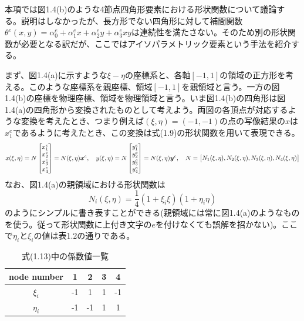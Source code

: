 \documentclass[dvipdfmx, 9pt, a4paper]{jsarticle}
\numberwithin{equation}{section}
\newcommand{\bm}[1]{{\mbox{\boldmath $#1$}}}
\begin{document}
本項では図1.4(b)のような4節点四角形要素における形状関数について議論する。説明はしなかったが、長方形でない四角形に対して補間関数$\theta^e(x, y)=\alpha^e_0 + \alpha^e_1x+\alpha^e_2y+\alpha^e_3xy$は連続性を満たさない。そのため別の形状関数が必要となる訳だが、ここではアイソパラメトリック要素という手法を紹介する。\par
まず、図1.4(a)に示すような$\xi-\eta$の座標系と、各軸$[-1,1]$の領域の正方形を考える。このような座標系を親座標、領域$[-1,1]$を親領域と言う。一方の図1.4(b)の座標を物理座標、領域を物理領域と言う。いま図1.4(b)の四角形は図1.4(a)の四角形から変換されたものとして考えよう。両図の各頂点が対応するような変換を考えたとき、つまり例えば$(\xi, \eta)=(-1, -1)$の点の写像結果の$x$は$x^e_1$であるように考えたとき、この変換は式(1.9)の形状関数を用いて表現できる。
\begin{equation}
x(\xi, \eta) = N
\begin{bmatrix}
x^e_1 \\ x^e_2 \\ x^e_3 \\ x^e_4
\end{bmatrix}=N(\xi, \eta)\bm x^e,~~~
y(\xi, \eta) = N
\begin{bmatrix}
y^e_1 \\ y^e_2 \\ y^e_3 \\ y^e_4
\end{bmatrix}=N(\xi, \eta)\bm y^e,~~~
N=\begin{bmatrix}
N_1(\xi, \eta), N_2(\xi, \eta), N_3(\xi, \eta), N_4(\xi, \eta)
\end{bmatrix}
\end{equation}
なお、図1.4(a)の親領域における形状関数は
\begin{equation}
N_i(\xi, \eta)=\frac{1}{4}(1+\xi_i\xi)(1+\eta_i\eta)
\end{equation}
のようにシンプルに書き表すことができる(親領域には常に図1.4(a)のようなものを使う。従って形状関数に上付き文字の$e$を付けなくても誤解を招かない)。ここで$\eta_i$と$\xi_i$の値は表1.2の通りである。\par
\begin{table}[b]
\begin{center}
\caption{式(1.13)中の係数値一覧}
\begin{tabular}{c|cccc}
\hline
node number & 1 & 2 & 3 & 4 \\ \hline
$\xi_i$ & -1 & 1 & 1 & -1 \\
$\eta_i$ & -1 & -1 & 1 & 1 \\ \hline
\end{tabular}
\end{center}
\end{table}
\end{document}
